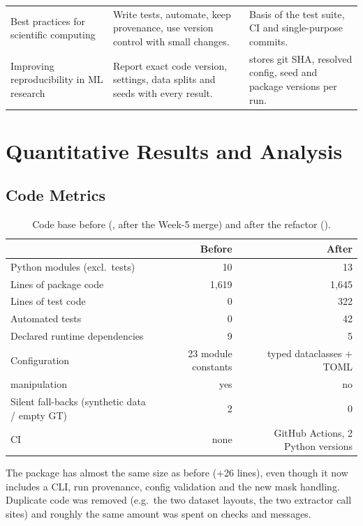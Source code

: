 \documentclass[11pt,a4paper]{article}
\newcommand{\code}[1]{\texttt{\detokenize{#1}}}
\begin{document}
\begin{center}
\begin{longtable}{@{}p{}p{}p{}@{}}
Best practices for scientific computing \cite{wilson2014} & Write tests, automate, keep provenance, use version control with small changes. & Basis of the test suite, CI and single-purpose commits. \\
Improving reproducibility in ML research \cite{pineau2021} & Report exact code version, settings, data splits and seeds with every result. & \code{run_config.json} stores git SHA, resolved config, seed and package versions per run. \\
\bottomrule
\end{longtable}
\end{center}

\section*{Quantitative Results and Analysis}

\subsection*{Code Metrics}

\begin{table}[h]
\centering
\caption{Code base before (\code{fd47eab}, after the Week-5 merge) and after the refactor (\code{e591877}).}
\label{tab:codemetrics}
\small
\begin{tabular}{@{}lrr@{}}
\toprule
& \textbf{Before} & \textbf{After} \\
\midrule
Python modules (excl.\ tests) & 10 & 13 \\
Lines of package code & 1{,}619 & 1{,}645 \\
Lines of test code & 0 & 322 \\
Automated tests & 0 & 42 \\
Declared runtime dependencies & 9 & 5 \\
Configuration & 23 module constants & typed dataclasses + TOML \\
\code{sys.path} manipulation & yes & no \\
Silent fall-backs (synthetic data / empty GT) & 2 & 0 \\
CI & none & GitHub Actions, 2 Python versions \\
\bottomrule
\end{tabular}
\end{table}

The package has almost the same size as before (+26 lines), even though it now includes a CLI, run provenance, config validation and the new mask handling. Duplicate code was removed (e.g.\ the two dataset layouts, the two extractor call sites) and roughly the same amount was spent on checks and messages.
\end{document}
